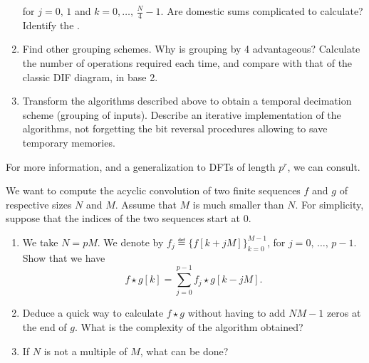 \begin{exo}
\begin{enumerate}
for $ j = 0, \, 1 $ and $ k = 0, \ldots, \, \frac{N}{4} -1 $. Are domestic sums complicated to calculate? Identify the .
\item Find other grouping schemes. Why is grouping by 4 advantageous? Calculate the number of operations required each time, and compare with that of the classic DIF diagram, in base 2.
\item Transform the algorithms described above to obtain a temporal decimation scheme (grouping of inputs). Describe an iterative implementation of the algorithms, not forgetting the bit reversal procedures allowing to save temporary memories.
\end{enumerate} For more information, and a generalization to DFTs of length $ p^r $, we can consult{\upshape \cite{vetterli-split-radix}}.
\end{exo}
 
 
\begin{exo}
\label{exo-calcul-convolution-fft}
 
 We want to compute the acyclic convolution of two finite sequences $ f $ and $ g $ of respective sizes $N$ and $ M $. Assume that $ M $ is much smaller than $N$. For simplicity, suppose that the indices of the two sequences start at $ 0 $. \begin{enumerate}
\item We take $ N = p M $. We denote by $ f_j \eqdef \{f[k + j M]\}_{k = 0}^{M-1} $, for $ j = 0, \, \ldots, \, p -1 $. Show that we have
\begin{equation*}
f \star g [k] = \sum_{j = 0}^{p-1}{f_j \star g [k - j M]}.
\end{equation*}
 
\item {} Deduce a quick way to calculate $ f \star g $ without having to add $ NM-1 $ zeros at the end of $ g $. What is the complexity of the algorithm obtained?
\item If $N$ is not a multiple of $ M $, what can be done?
\end{enumerate}
\end{exo}
 
